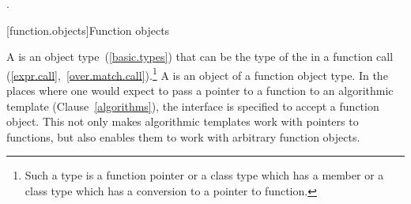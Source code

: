 \begin{itemdescr}
\pnum
\returns {}.
\end{itemdescr}

[function.objects]{Function objects}

\pnum
A  is an object
type~(\ref{basic.types}) that can be the type of the
 in a function call
(\ref{expr.call},~\ref{over.match.call}).\footnote{Such a type is a function
pointer or a class type which has a member  or a class type
which has a conversion to a pointer to function.} A  is an
object of a function object type. In the places where one would expect to pass a
pointer to a function to an algorithmic template (Clause~\ref{algorithms}), the
interface is specified to accept a function object. This not only makes
algorithmic templates work with pointers to functions, but also enables them to
work with arbitrary function objects.

\pnum
{}

